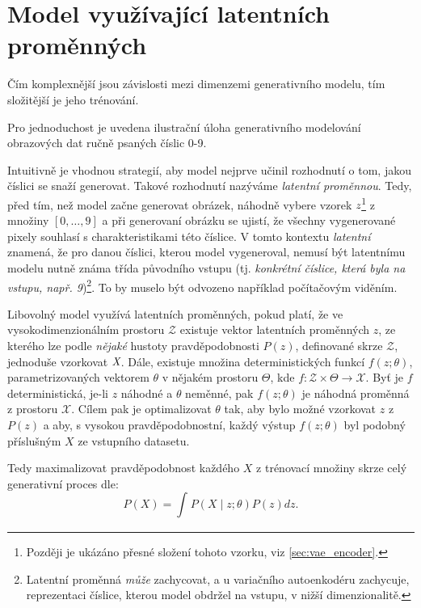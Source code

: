 \section{Model využívající latentních proměnných}
Čím komplexnější jsou závislosti mezi dimenzemi generativního modelu, tím složitější je jeho trénování.

Pro jednoduchost je uvedena ilustrační úloha generativního modelování obrazových dat ručně psaných číslic 0-9.

Intuitivně je  vhodnou strategií, aby model nejprve učinil rozhodnutí o tom, jakou číslici se snaží generovat.
Takové rozhodnutí nazýváme \emph{latentní proměnnou}. Tedy, před tím, než model začne generovat obrázek, náhodně vybere vzorek $\emph{z}$\footnote{Později je ukázáno přesné složení tohoto vzorku, viz \autoref{sec:vae_encoder}.} z množiny $[0, \dots, 9]$ a při generovaní obrázku se ujistí, že všechny vygenerované pixely souhlasí s charakteristikami této číslice.
V tomto kontextu \emph{latentní} znamená, že pro danou číslici, kterou model vygeneroval, nemusí být latentnímu modelu nutně známa třída původního vstupu (tj. \emph{konkrétní číslice, která byla na vstupu, např. 9})\footnote{Latentní proměnná \emph{může} zachycovat, a u variačního autoenkodéru zachycuje, reprezentaci číslice, kterou model obdržel na vstupu, v nižší dimenzionalitě.}. To by muselo být odvozeno například počítačovým viděním. \cite{Doersch2021}

Libovolný model využívá latentních proměnných, pokud platí, že ve vysokodimenzionálním prostoru $\mathcal{Z}$ existuje vektor latentních proměnných $z$, ze kterého lze podle \emph{nějaké} hustoty pravděpodobnosti $P(z)$, definované skrze $\mathcal{Z}$, jednoduše vzorkovat $\emph{X}$.
Dále, existuje množina deterministických funkcí $f(z;\theta)$, parametrizovaných vektorem $\theta$ v nějakém prostoru $\Theta$, kde $f: \mathcal{Z} \times \Theta \rightarrow \mathcal{X}$. Byť je $f$ deterministická, je-li $z$ náhodné a $\theta$ neměnné, pak $f(z;\theta)$ je náhodná proměnná z prostoru $\mathcal{X}$.
Cílem pak je optimalizovat $\theta$ tak, aby bylo možné vzorkovat $z$ z $P(z)$ a aby, s vysokou pravděpodobnostní, každý výstup $f(z; \theta)$ byl podobný příslušným $X$ ze vstupního datasetu. \cite{Doersch2021}

Tedy maximalizovat pravděpodobnost každého $X$ z trénovací množiny skrze celý generativní proces dle:
\begin{equation}\label{eq:maximum_likelihood}
    P(X) = \int_{}^{} P(X\mid z;\theta)P(z)dz.
\end{equation}

